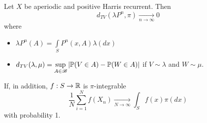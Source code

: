 \documentclass{article}
\begin{document}
\begin{definition}
    Let $X$ be aperiodic and positive Harris recurrent. Then
        \[d_{TV}(\lambda P^n,\pi)\xrightarrow[n\to\infty]{}0
        \]
        where
        \begin{itemize}
            \item $\displaystyle\lambda P^n(A)=\int\limits_SP^n(x,A)\lambda(dx)$
            \item $\displaystyle d_{TV}(\lambda,\mu)=\sup\limits_{A\in\mathscr{B}}|\mathbb{P}(V\in A)-\mathbb{P}(W\in A)|$ if $V\sim\lambda$ and $W\sim\mu$.
        \end{itemize}
        If, in addition, $f:S\to\mathbb{R}$ is $\pi$-integrable
        \[
        \frac{1}{N}\sum_{i=1}^Nf(X_n)\xrightarrow[N\to\infty]{}\int_Sf(x)\pi(dx)
        \]
        with probability 1.
\end{definition}
\begin{figure}[H]
    \centering
    \label{dperiod}
\end{figure}
\end{document}
